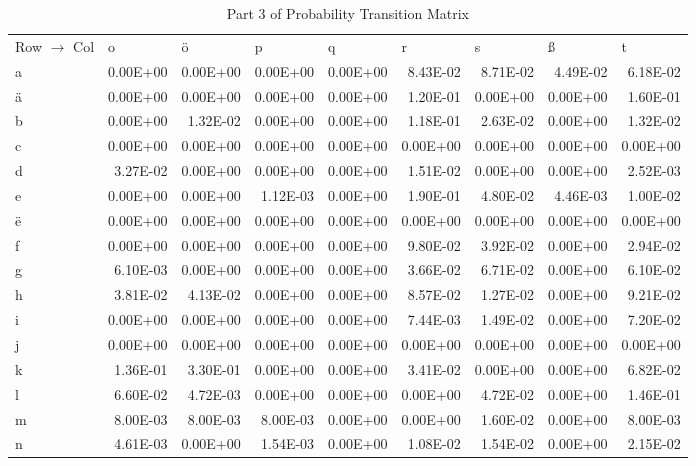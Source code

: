 \documentclass[11pt,a4paper]{CLabBookTemplate} %
\begin{document}
\begin{table}[htbp]
	\centering
	\caption{Part 3 of Probability Transition Matrix}
	\begin{tabular}{lrrrrrrrr}
		Row $\rightarrow$ Col & \multicolumn{1}{l}{o} & \multicolumn{1}{l}{ö} & \multicolumn{1}{l}{p} & \multicolumn{1}{l}{q} & \multicolumn{1}{l}{r} & \multicolumn{1}{l}{s} & \multicolumn{1}{l}{ß} & \multicolumn{1}{l}{t} \\
		a     & 0.00E+00 & 0.00E+00 & 0.00E+00 & 0.00E+00 & 8.43E-02 & 8.71E-02 & 4.49E-02 & 6.18E-02 \\
		ä     & 0.00E+00 & 0.00E+00 & 0.00E+00 & 0.00E+00 & 1.20E-01 & 0.00E+00 & 0.00E+00 & 1.60E-01 \\
		b     & 0.00E+00 & 1.32E-02 & 0.00E+00 & 0.00E+00 & 1.18E-01 & 2.63E-02 & 0.00E+00 & 1.32E-02 \\
		c     & 0.00E+00 & 0.00E+00 & 0.00E+00 & 0.00E+00 & 0.00E+00 & 0.00E+00 & 0.00E+00 & 0.00E+00 \\
		d     & 3.27E-02 & 0.00E+00 & 0.00E+00 & 0.00E+00 & 1.51E-02 & 0.00E+00 & 0.00E+00 & 2.52E-03 \\
		e     & 0.00E+00 & 0.00E+00 & 1.12E-03 & 0.00E+00 & 1.90E-01 & 4.80E-02 & 4.46E-03 & 1.00E-02 \\
		ë     & 0.00E+00 & 0.00E+00 & 0.00E+00 & 0.00E+00 & 0.00E+00 & 0.00E+00 & 0.00E+00 & 0.00E+00 \\
		f     & 0.00E+00 & 0.00E+00 & 0.00E+00 & 0.00E+00 & 9.80E-02 & 3.92E-02 & 0.00E+00 & 2.94E-02 \\
		g     & 6.10E-03 & 0.00E+00 & 0.00E+00 & 0.00E+00 & 3.66E-02 & 6.71E-02 & 0.00E+00 & 6.10E-02 \\
		h     & 3.81E-02 & 4.13E-02 & 0.00E+00 & 0.00E+00 & 8.57E-02 & 1.27E-02 & 0.00E+00 & 9.21E-02 \\
		i     & 0.00E+00 & 0.00E+00 & 0.00E+00 & 0.00E+00 & 7.44E-03 & 1.49E-02 & 0.00E+00 & 7.20E-02 \\
		j     & 0.00E+00 & 0.00E+00 & 0.00E+00 & 0.00E+00 & 0.00E+00 & 0.00E+00 & 0.00E+00 & 0.00E+00 \\
		k     & 1.36E-01 & 3.30E-01 & 0.00E+00 & 0.00E+00 & 3.41E-02 & 0.00E+00 & 0.00E+00 & 6.82E-02 \\
		l     & 6.60E-02 & 4.72E-03 & 0.00E+00 & 0.00E+00 & 0.00E+00 & 4.72E-02 & 0.00E+00 & 1.46E-01 \\
		m     & 8.00E-03 & 8.00E-03 & 8.00E-03 & 0.00E+00 & 0.00E+00 & 1.60E-02 & 0.00E+00 & 8.00E-03 \\
		n     & 4.61E-03 & 0.00E+00 & 1.54E-03 & 0.00E+00 & 1.08E-02 & 1.54E-02 & 0.00E+00 & 2.15E-02 \\

\end{tabular}
\end{table}
\end{document}
